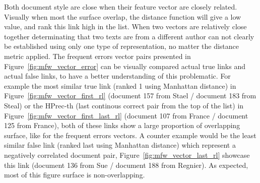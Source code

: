 Both document style are close when their feature vector are closely related.
Visually when most the surface overlap, the distance function will give a low value, and rank this link high in the list.
When two vectors are relatively close together determinating that two texts are from a different author can not clearly be established using only one type of representation, no matter the distance metric applied.
The frequent errors vector pairs presented in Figure~\ref{fig:mfw_vector_error} can be visually compared actual true links and actual false links, to have a better understanding of this problematic.
For example the most similar true link (ranked 1 using Manhattan distance) in Figure~\ref{fig:mfw_vector_first_rl} (document 157 from Stael / document 183 from Steal) or the HPrec-th (last continous correct pair from the top of the list) in Figure~\ref{fig:mfw_vector_first_last_rl} (document 107 from France / document 125 from France), both of these links show a large proportion of overlapping surface, like for the frequent errors vectors.
A counter example would be the least similar false link (ranked last using Manhattan distance) which represent a negatively correlated document pair, Figure~\ref{fig:mfw_vector_last_rl} showcase this link (document 136 from Sue / document 188 from Regnier).
As expected, most of this figure surface is non-overlapping.

